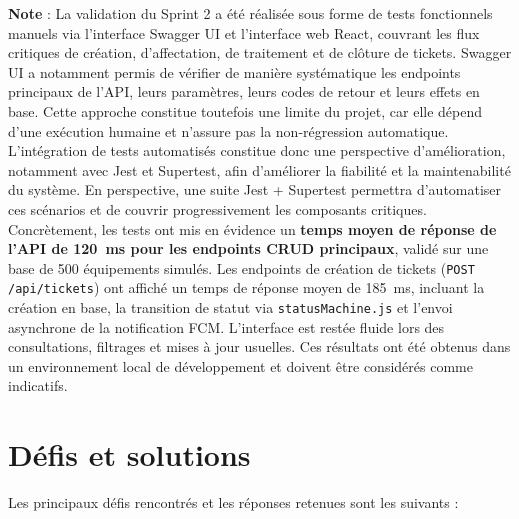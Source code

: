 \textbf{Note} : La validation du Sprint 2 a été réalisée sous forme de tests fonctionnels manuels via l'interface Swagger UI et l'interface web React, couvrant les flux critiques de création, d'affectation, de traitement et de clôture de tickets. Swagger UI a notamment permis de vérifier de manière systématique les endpoints principaux de l'API, leurs paramètres, leurs codes de retour et leurs effets en base. Cette approche constitue toutefois une limite du projet, car elle dépend d'une exécution humaine et n’assure pas la non-régression automatique. L’intégration de tests automatisés constitue donc une perspective d’amélioration, notamment avec Jest et Supertest, afin d'améliorer la fiabilité et la maintenabilité du système. En perspective, une suite Jest + Supertest permettra d'automatiser ces scénarios et de couvrir progressivement les composants critiques. Concrètement, les tests ont mis en évidence un \textbf{temps moyen de réponse de l'API de 120~ms pour les endpoints CRUD principaux}, validé sur une base de 500 équipements simulés. Les endpoints de création de tickets (\texttt{POST /api/tickets}) ont affiché un temps de réponse moyen de 185~ms, incluant la création en base, la transition de statut via \texttt{statusMachine.js} et l'envoi asynchrone de la notification FCM. L'interface est restée fluide lors des consultations, filtrages et mises à jour usuelles. Ces résultats ont été obtenus dans un environnement local de développement et doivent être considérés comme indicatifs.

\section{Défis et solutions}
\label{subsec:defis_sprint2}

Les principaux défis rencontrés et les réponses retenues sont les suivants :

